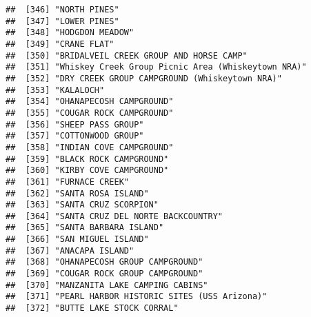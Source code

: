 \documentclass[
]{article}
\begin{document}
\begin{verbatim}
##  [346] "NORTH PINES"                                                                         
##  [347] "LOWER PINES"                                                                         
##  [348] "HODGDON MEADOW"                                                                      
##  [349] "CRANE FLAT"                                                                          
##  [350] "BRIDALVEIL CREEK GROUP AND HORSE CAMP"                                               
##  [351] "Whiskey Creek Group Picnic Area (Whiskeytown NRA)"                                   
##  [352] "DRY CREEK GROUP CAMPGROUND (Whiskeytown NRA)"                                        
##  [353] "KALALOCH"                                                                            
##  [354] "OHANAPECOSH CAMPGROUND"                                                              
##  [355] "COUGAR ROCK CAMPGROUND"                                                              
##  [356] "SHEEP PASS GROUP"                                                                    
##  [357] "COTTONWOOD GROUP"                                                                    
##  [358] "INDIAN COVE CAMPGROUND"                                                              
##  [359] "BLACK ROCK CAMPGROUND"                                                               
##  [360] "KIRBY COVE CAMPGROUND"                                                               
##  [361] "FURNACE CREEK"                                                                       
##  [362] "SANTA ROSA ISLAND"                                                                   
##  [363] "SANTA CRUZ SCORPION"                                                                 
##  [364] "SANTA CRUZ DEL NORTE BACKCOUNTRY"                                                    
##  [365] "SANTA BARBARA ISLAND"                                                                
##  [366] "SAN MIGUEL ISLAND"                                                                   
##  [367] "ANACAPA ISLAND"                                                                      
##  [368] "OHANAPECOSH GROUP CAMPGROUND"                                                        
##  [369] "COUGAR ROCK GROUP CAMPGROUND"                                                        
##  [370] "MANZANITA LAKE CAMPING CABINS"                                                       
##  [371] "PEARL HARBOR HISTORIC SITES (USS Arizona)"                                           
##  [372] "BUTTE LAKE STOCK CORRAL"                                                             

\end{verbatim}
\end{document}
